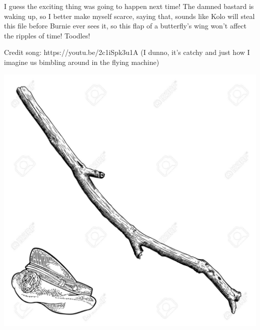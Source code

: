 I guess the exciting thing was going to happen next time! The damned bastard is waking up, so I better make myself scarce, saying that, sounds like Kolo will steal this file before Burnie ever sees it, so this flap of a butterfly’s wing won’t affect the ripples of time! Toodles!\medskip

Credit song: https://youtu.be/2c1iSpk3u1A (I dunno, it's catchy and just how I imagine us bimbling around in the flying machine)\medskip




\vspace*{5mm}

\begin{center}
\includegraphics[width=\textwidth]{./content/img/xxx.jpg}
\begin{figure}[h]
\end{figure}
\end{center}

\clearpage